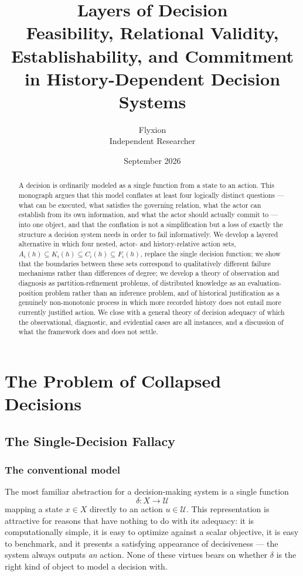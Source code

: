 \documentclass[11pt]{report}
\title{\textbf{Layers of Decision} \\ \large Feasibility, Relational Validity, Establishability, and Commitment \\ in History-Dependent Decision Systems}
\author{Flyxion \\ \small Independent Researcher}
\date{September 2026}
\theoremstyle{definition}
\theoremstyle{plain}
\newcommand{\Uni}{\mathcal{U}}
\begin{document}
\maketitle

\begin{abstract}
\noindent A decision is ordinarily modeled as a single function from a state to an action. This monograph argues that this model conflates at least four logically distinct questions --- what can be executed, what satisfies the governing relation, what the actor can establish from its own information, and what the actor should actually commit to --- into one object, and that the conflation is not a simplification but a loss of exactly the structure a decision system needs in order to fail informatively. We develop a layered alternative in which four nested, actor- and history-relative action sets, $A_i(h) \subseteq K_i(h) \subseteq C_i(h) \subseteq F_i(h)$, replace the single decision function; we show that the boundaries between these sets correspond to qualitatively different failure mechanisms rather than differences of degree; we develop a theory of observation and diagnosis as partition-refinement problems, of distributed knowledge as an evaluation-position problem rather than an inference problem, and of historical justification as a genuinely non-monotonic process in which more recorded history does not entail more currently justified action. We close with a general theory of decision adequacy of which the observational, diagnostic, and evidential cases are all instances, and a discussion of what the framework does and does not settle.
\end{abstract}
\tableofcontents

\part{The Problem of Collapsed Decisions}

\chapter{The Single-Decision Fallacy}

\section{The conventional model}
The most familiar abstraction for a decision-making system is a single function
\[
\delta: X \to \Uni
\]
mapping a state $x \in X$ directly to an action $u \in \Uni$. This representation is attractive for reasons that have nothing to do with its adequacy: it is computationally simple, it is easy to optimize against a scalar objective, it is easy to benchmark, and it presents a satisfying appearance of decisiveness --- the system always outputs \emph{an} action. None of these virtues bears on whether $\delta$ is the right kind of object to model a decision with.
\end{document}
